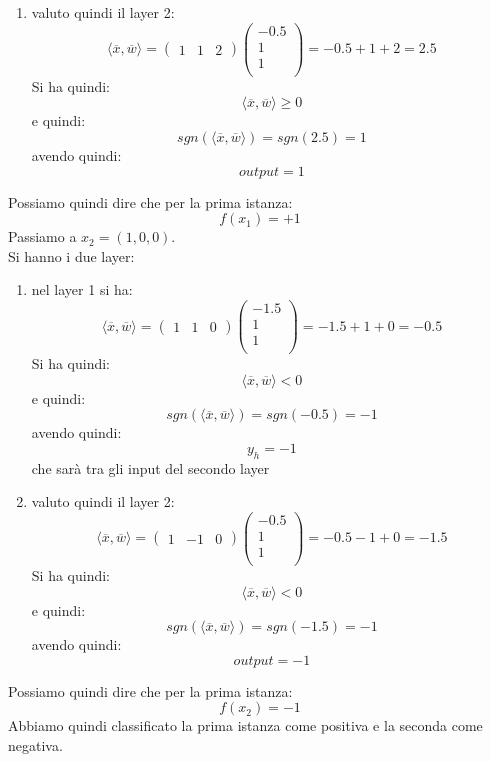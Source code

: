 \documentclass[a4paper,12pt, oneside]{book}
\begin{document}
\begin{esercizio}
\begin{enumerate}
\[\begin{matrix}
        \end{matrix}
      \right)= -1.5+0+2 = 0.5\]
    Si ha quindi:
    \[\langle \overline{x},\overline{w}\rangle\geq 0\]
    e quindi:
    \[sgn(\langle \overline{x},\overline{w}\rangle)=sgn(0.5)=1\]
    avendo quindi:
    \[y_h=1\]
    che sarà tra gli input del secondo layer
    \item valuto quindi il layer 2:
    \[\langle \overline{x},\overline{w}\rangle=
      \left(\begin{matrix}
          1 & 1 & 2
        \end{matrix}\right)
      \left(
        \begin{matrix}
          -0.5 \\
          1 \\
          1 \\
        \end{matrix}
      \right)= -0.5+1+2 = 2.5\]
    Si ha quindi:
    \[\langle \overline{x},\overline{w}\rangle\geq 0\]
    e quindi:
    \[sgn(\langle \overline{x},\overline{w}\rangle)=sgn(2.5)=1\]
    avendo quindi:
    \[output=1\]
  \end{enumerate}
  Possiamo quindi dire che per la prima istanza:
  \[f(x_1)=+1\]
  Passiamo a $x_2=(1,0,0)$.\\
  Si hanno i due layer:
  \begin{enumerate}
    \item nel layer 1 si ha:
    \[\langle \overline{x},\overline{w}\rangle=
      \left(\begin{matrix}
          1 & 1 & 0
        \end{matrix}\right)
      \left(
        \begin{matrix}
          -1.5 \\
          1 \\
          1 \\
        \end{matrix}
      \right)= -1.5+1+0 = -0.5\]
    Si ha quindi:
    \[\langle \overline{x},\overline{w}\rangle< 0\]
    e quindi:
    \[sgn(\langle \overline{x},\overline{w}\rangle)=sgn(-0.5)=-1\]
    avendo quindi:
    \[y_h=-1\]
    che sarà tra gli input del secondo layer
    \item valuto quindi il layer 2:
    \[\langle \overline{x},\overline{w}\rangle=
      \left(\begin{matrix}
          1 & -1 & 0
        \end{matrix}\right)
      \left(
        \begin{matrix}
          -0.5 \\
          1 \\
          1 \\
        \end{matrix}
      \right)= -0.5-1+0 = -1.5\]
    Si ha quindi:
    \[\langle \overline{x},\overline{w}\rangle < 0\]
    e quindi:
    \[sgn(\langle \overline{x},\overline{w}\rangle)=sgn(-1.5)=-1\]
    avendo quindi:
    \[output=-1\]
  \end{enumerate}
  Possiamo quindi dire che per la prima istanza:
  \[f(x_2)=-1\]
  Abbiamo quindi classificato la prima istanza come positiva e la seconda come
  negativa.
\end{esercizio}
\end{document}
